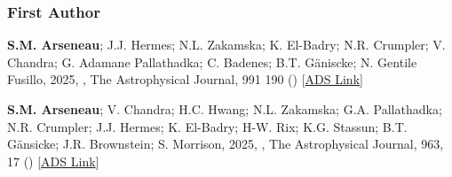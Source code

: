 \documentclass[12pt,letterpaper]{article}
\begin{document}
\subsubsection{First Author}
\begin{list}{}{\cvlist}
  \item[{\color{numcolor}\scriptsize2}] \textbf{S.M. Arseneau}; J.J. Hermes; N.L. Zakamska; K. El-Badry; N.R. Crumpler; V. Chandra; G. Adamane Pallathadka; C. Badenes; B.T. G\"aniscke; N. Gentile Fusillo, 2025, , The Astrophysical Journal, 991 190 () [\href{https://ui.adsabs.harvard.edu/abs/2025arXiv250804775A}{ADS Link}]

  \item[{\color{numcolor}\scriptsize1}] \textbf{S.M. Arseneau}; V. Chandra; H.C. Hwang; N.L. Zakamska; G.A. Pallathadka; N.R. Crumpler; J.J. Hermes; K. El-Badry; H-W. Rix; K.G. Stassun; B.T. G\"ansicke; J.R. Brownstein; S. Morrison, 2025, , The Astrophysical Journal, 963, 17 () [\href{https://ui.adsabs.harvard.edu/abs/2024ApJ...963...17A/abstract}{ADS Link}]
\end{list}
\end{document}
